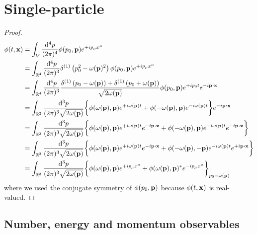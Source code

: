 \section{Single-particle}

\begin{proof}
\begin{equation*}
	\begin{split}
		\phi(t,\vb{x})
		&=
		\int_V\frac{\dd[4]{p}}{(2\pi)^4}
		\phi(p_0,\vb{p})
		e^{+ip_\mu x^\mu}
		\\
		&=
		\int_{\mathbb{R}^4}\frac{\dd[4]{p}}{(2\pi)^3}
		\delta^{(1)}\left(p_0^2-\omega(\vb{p})^2\right)
		\phi(p_0,\vb{p})
		e^{+ip_\mu x^\mu}
		\\
		&=
		\int_{\mathbb{R}^4}\frac{\dd[4]{p}}{(2\pi)^3}
		\frac{
			\delta^{(1)}\left(p_0-\omega(\vb{p})\right)
			+
			\delta^{(1)}\left(p_0+\omega(\vb{p})\right)
		}{\sqrt{2\omega(\vb{p})}}
		\phi(p_0,\vb{p})
		e^{+ip_0t}
		e^{-i\vb{p}\vdot\vb{x}}
		\\
		&=
		\int_{\mathbb{R}^3}\frac{\dd[3]{p}}{(2\pi)^3\sqrt{2\omega(\vb{p})}}
		\biggl\{
			\phi(\omega(\vb{p}),\vb{p})
			e^{+i\omega(\vb{p})t}
			+
			\phi(-\omega(\vb{p}),\vb{p})
			e^{-i\omega(\vb{p})t}
		\biggr\}
		e^{-i\vb{p}\vdot\vb{x}}
		\\
		&=
		\int_{\mathbb{R}^3}\frac{\dd[3]{p}}{(2\pi)^3\sqrt{2\omega(\vb{p})}}
		\biggl\{
			\phi(\omega(\vb{p}),\vb{p})
			e^{+i\omega(\vb{p})t}
			e^{-i\vb{p}\vdot\vb{x}}
			+
			\phi(-\omega(\vb{p}),\vb{p})
			e^{-i\omega(\vb{p})t}
			e^{-i\vb{p}\vdot\vb{x}}
		\biggr\}
		\\
		&=
		\int_{\mathbb{R}^3}\frac{\dd[3]{p}}{(2\pi)^3\sqrt{2\omega(\vb{p})}}
		\biggl\{
			\phi(\omega(\vb{p}),\vb{p})
			e^{+i\omega(\vb{p})t}
			e^{-i\vb{p}\vdot\vb{x}}
			+
			\phi(-\omega(\vb{p}),-\vb{p})
			e^{-i\omega(\vb{p})t}
			e^{+i\vb{p}\vdot\vb{x}}
		\biggr\}
		\\
		&=
		\int_{\mathbb{R}^3}\frac{\dd[3]{p}}{(2\pi)^3\sqrt{2\omega(\vb{p})}}
		\biggl\{
			\phi(\omega(\vb{p}),\vb{p})
			e^{+ip_\mu x^\mu}
			+
			\phi(\omega(\vb{p}),\vb{p})^*
			e^{-ip_\mu x^\mu}
		\biggr\}_{p_0=\omega(\vb{p})}
	\end{split}
\end{equation*}
where we used the conjugate symmetry of $\phi(p_0,\vb{p})$ because $\phi(t,\vb{x})$ is real-valued.
\end{proof}

\subsection{Number, energy and momentum observables}

